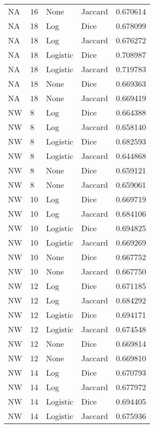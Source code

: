 \documentclass{article}
\begin{document}
\begin{center}
\begin{supertabular}{| l | l | l | l | l |}
            NA & 16 & None & Jaccard & 0.670614 \\
            NA & 18 & Log & Dice & 0.678099 \\
            NA & 18 & Log & Jaccard & 0.676272 \\
            NA & 18 & Logistic & Dice & 0.708987 \\
            NA & 18 & Logistic & Jaccard & 0.719783 \\
            NA & 18 & None & Dice & 0.669363 \\
            NA & 18 & None & Jaccard & 0.669419 \\
            NW & 8 & Log & Dice & 0.664388 \\
            NW & 8 & Log & Jaccard & 0.658140 \\
            NW & 8 & Logistic & Dice & 0.682593 \\
            NW & 8 & Logistic & Jaccard & 0.644868 \\
            NW & 8 & None & Dice & 0.659121 \\
            NW & 8 & None & Jaccard & 0.659061 \\
            NW & 10 & Log & Dice & 0.669719 \\
            NW & 10 & Log & Jaccard & 0.684106 \\
            NW & 10 & Logistic & Dice & 0.694825 \\
            NW & 10 & Logistic & Jaccard & 0.669269 \\
            NW & 10 & None & Dice & 0.667752 \\
            NW & 10 & None & Jaccard & 0.667750 \\
            NW & 12 & Log & Dice & 0.671185 \\
            NW & 12 & Log & Jaccard & 0.684292 \\
            NW & 12 & Logistic & Dice & 0.694171 \\
            NW & 12 & Logistic & Jaccard & 0.674548 \\
            NW & 12 & None & Dice & 0.669814 \\
            NW & 12 & None & Jaccard & 0.669810 \\
            NW & 14 & Log & Dice & 0.670793 \\
            NW & 14 & Log & Jaccard & 0.677972 \\
            NW & 14 & Logistic & Dice & 0.694405 \\
            NW & 14 & Logistic & Jaccard & 0.675936 \\

\end{supertabular}
\end{center}
\end{document}
